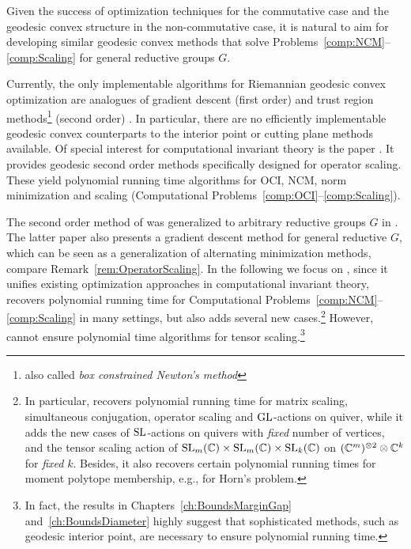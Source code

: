 Given the success of optimization techniques for the commutative case and the geodesic convex structure in the non-commutative case, it is natural to aim for developing similar geodesic convex methods that solve Problems~\ref{comp:NCM}--\ref{comp:Scaling} for general reductive groups $G$.

Currently, the only implementable algorithms for Riemannian geodesic convex optimization are analogues of gradient descent (first order) and trust region methods\footnote{also called \emph{box constrained Newton's method}} (second order)
\cite{absil2008optimization, bacak2014convex, zhang2016first, allen2018operator, BoumalBook}. In particular, there are no efficiently implementable geodesic convex counterparts to the interior point or cutting plane methods available.
Of special interest for computational invariant theory is the paper \cite{allen2018operator}. It provides geodesic second order methods specifically designed for operator scaling. These yield polynomial running time algorithms for OCI, NCM, norm minimization and scaling (Computational Problems~\ref{comp:OCI}--\ref{comp:Scaling}).

The second order method of \cite{allen2018operator} was generalized to arbitrary reductive groups $G$ in \cite[Algorithm~5.1]{GradflowArXiv}. The latter paper also presents a gradient descent method for general reductive $G$, which can be seen as a generalization of alternating minimization methods, compare Remark~\ref{rem:OperatorScaling}. In the following we focus on \cite{GradflowArXiv}, %
since it unifies existing optimization approaches in computational invariant theory, recovers polynomial running time for Computational Problems~\ref{comp:NCM}--\ref{comp:Scaling} in many settings, but also adds several new cases.\footnote{In particular, \cite{GradflowArXiv} recovers polynomial running time for matrix scaling, simultaneous conjugation, operator scaling and $\operatorname{GL}$-actions on quiver, while it adds the new cases of $\operatorname{SL}$-actions on quivers with \emph{fixed} number of vertices, and the tensor scaling action of $\operatorname{SL}_m(\mathbb C) \times \operatorname{SL}_m(\mathbb C) \times \operatorname{SL}_k(\mathbb C)$ on $(\mathbb C^m)^{\otimes 2} \otimes \mathbb C^k$ for \emph{fixed} $k$. Besides, it also recovers certain polynomial running times for moment polytope membership, e.g., for Horn's problem.}
However, \cite{GradflowArXiv} cannot ensure polynomial time algorithms for tensor scaling.\footnote{In fact, the results in Chapters~\ref{ch:BoundsMarginGap} and~\ref{ch:BoundsDiameter} highly suggest that sophisticated methods, such as geodesic interior point, are necessary to ensure polynomial running time.}


